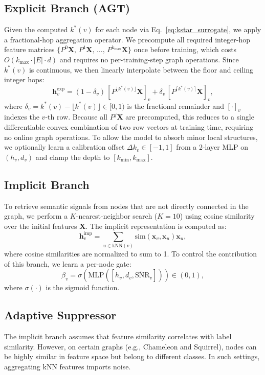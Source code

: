 \documentclass[letterpaper]{article}
\newcommand{\snrv}{\widetilde{\mathrm{SNR}}_v}
\begin{document}
\subsection{Explicit Branch (AGT)}
Given the computed $k^*(v)$ for each node via Eq.~\eqref{eq:kstar_surrogate}, we apply a fractional-hop aggregation operator. We precompute all required integer-hop feature matrices $\{P^0\mathbf{X},\, P^1\mathbf{X},\, \ldots,\, P^{k_{\max}}\mathbf{X}\}$ once before training, which costs $O(k_{\max} \cdot |E| \cdot d)$ and requires no per-training-step graph operations. Since $k^*(v)$ is continuous, we then linearly interpolate between the floor and ceiling integer hops:
\begin{equation}
  \mathbf{h}_v^{\mathrm{exp}} = (1 - \delta_v)\, [P^{\lfloor k^*(v) \rfloor}\mathbf{X}]_v + \delta_v\, [P^{\lceil k^*(v) \rceil}\mathbf{X}]_v,
\end{equation}
where $\delta_v = k^*(v) - \lfloor k^*(v) \rfloor \in [0,1)$ is the fractional remainder and $[\cdot]_v$ indexes the $v$-th row. Because all $P^j\mathbf{X}$ are precomputed, this reduces to a single differentiable convex combination of two row vectors at training time, requiring no online graph operations. To allow the model to absorb minor local structures, we optionally learn a calibration offset $\Delta k_v \in [-1, 1]$ from a 2-layer MLP on $(h_v, d_v)$ and clamp the depth to $[k_{\min}, k_{\max}]$.

\subsection{Implicit Branch}
To retrieve semantic signals from nodes that are not directly connected in the graph, we perform a $K$-nearest-neighbor search ($K=10$) using cosine similarity over the initial features $\mathbf{X}$. The implicit representation is computed as:
\begin{equation}
  \mathbf{h}_v^{\mathrm{imp}} = \sum_{u \in \mathrm{kNN}(v)} \text{sim}(\mathbf{x}_v, \mathbf{x}_u) \mathbf{x}_u,
\end{equation}
where cosine similarities are normalized to sum to 1. To control the contribution of this branch, we learn a per-node gate:
\begin{equation}
  \beta_v = \sigma\left(\mathrm{MLP}([h_v, d_v, \snrv])\right) \in (0, 1),
\end{equation}
where $\sigma(\cdot)$ is the sigmoid function.

\subsection{Adaptive Suppressor}
The implicit branch assumes that feature similarity correlates with label similarity. However, on certain graphs (e.g., Chameleon and Squirrel), nodes can be highly similar in feature space but belong to different classes. In such settings, aggregating kNN features imports noise.
\end{document}
